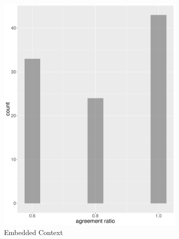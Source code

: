 \begin{figure}
\begin{subfigure}[b]{0.4\textwidth}
        \includegraphics[width=\textwidth]{plots/hist_agreement_ec}
        \caption{Embedded Context}
        \label{fig:hist_agreement_ec}
    \end{subfigure}
    ~
    \begin{subfigure}[b]{0.4\textwidth}

\end{subfigure}
\end{figure}
